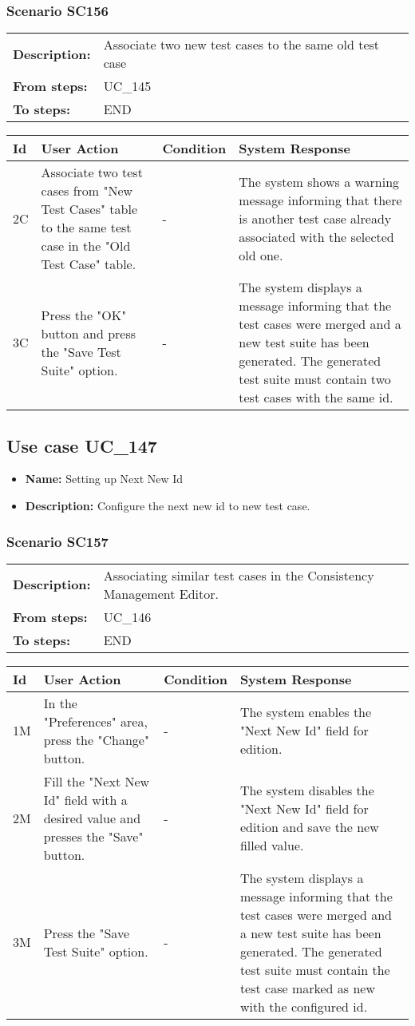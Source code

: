 \documentclass[a4paper,11pt]{article}
\newcommand{\bl}{\\ \hline}
\begin{document}
\subsubsection*{Scenario SC156}
\begin{tabular}{p{1in}p{4in}}
{\bf Description:} & Associate two new test cases to the same old test case
				 \\
{\bf From steps:} & UC_145#2M \\
{\bf To steps:} & END \\
\end{tabular}
 
\begin{tabular}{|p{0.8in}|p{1.6in}|p{1.6in}|p{1.6in}|}
\hline
Id & User Action & Condition & System Response  \bl 
2C & Associate two test cases from "New Test Cases" table to the
						same test case in the "Old Test Case" table. & - & The system shows a warning message informing that there
						is another test case already associated with the selected old one.
					 \bl 
3C & Press the "OK" button and press the "Save Test Suite"
						option. & - & The system displays a message informing that the test
						cases were merged and a new test suite has been generated. The
						generated test suite must contain two test cases with the same id.
					 \bl 
\end{tabular}
\subsection*{Use case UC_147}
\begin{itemize}
\item {\bf Name: }Setting up Next New Id
\item {\bf Description: }Configure the next new id to new test case.
			
\end{itemize}
\subsubsection*{Scenario SC157}
\begin{tabular}{p{1in}p{4in}}
{\bf Description:} & Associating similar test cases in the Consistency
					Management Editor. \\
{\bf From steps:} & UC_146#2A \\
{\bf To steps:} & END \\
\end{tabular}
 
\begin{tabular}{|p{0.8in}|p{1.6in}|p{1.6in}|p{1.6in}|}
\hline
Id & User Action & Condition & System Response  \bl 
1M & In the "Preferences" area, press the "Change" button.
					 & - & The system enables the "Next New Id" field for edition.
					 \bl 
2M & Fill the "Next New Id" field with a desired value and
						presses the "Save" button. & - & The system disables the "Next New Id" field for edition
						and save the new filled value. \bl 
3M & Press the "Save Test Suite" option. & - & The system displays a message informing that the test
						cases were merged and a new test suite has been generated. The
						generated test suite must contain the test case marked as new with
						the configured id.  \bl 
\end{tabular}
\end{document}
